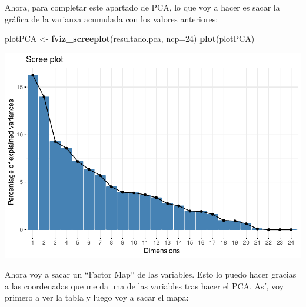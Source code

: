 \documentclass[]{article}
\newenvironment{Shaded}{\begin{snugshade}}{\end{snugshade}}
\newcommand{\KeywordTok}[1]{\textcolor[rgb]{0.13,0.29,0.53}{\textbf{#1}}}
\newcommand{\DataTypeTok}[1]{\textcolor[rgb]{0.13,0.29,0.53}{#1}}
\newcommand{\DecValTok}[1]{\textcolor[rgb]{0.00,0.00,0.81}{#1}}
\newcommand{\StringTok}[1]{\textcolor[rgb]{0.31,0.60,0.02}{#1}}
\newcommand{\OperatorTok}[1]{\textcolor[rgb]{0.81,0.36,0.00}{\textbf{#1}}}
\newcommand{\NormalTok}[1]{#1}
\begin{document}
Ahora, para completar este apartado de PCA, lo que voy a hacer es sacar
la gráfica de la varianza acumulada con los valores anteriores:

\begin{Shaded}
\begin{Highlighting}[]
\NormalTok{plotPCA <-}\StringTok{ }\KeywordTok{fviz_screeplot}\NormalTok{(resultado.pca, }\DataTypeTok{ncp=}\DecValTok{24}\NormalTok{)}
\KeywordTok{plot}\NormalTok{(plotPCA)}
\end{Highlighting}
\end{Shaded}

\includegraphics{codigo_files/figure-latex/PCA_eigenvalues_graph-1.pdf}

Ahora voy a sacar un ``Factor Map'' de las variables. Esto lo puedo
hacer gracias a las coordenadas que me da una de las variables tras
hacer el PCA. Así, voy primero a ver la tabla y luego voy a sacar el
mapa:

\begin{Shaded}
\end{Shaded}
\end{document}
